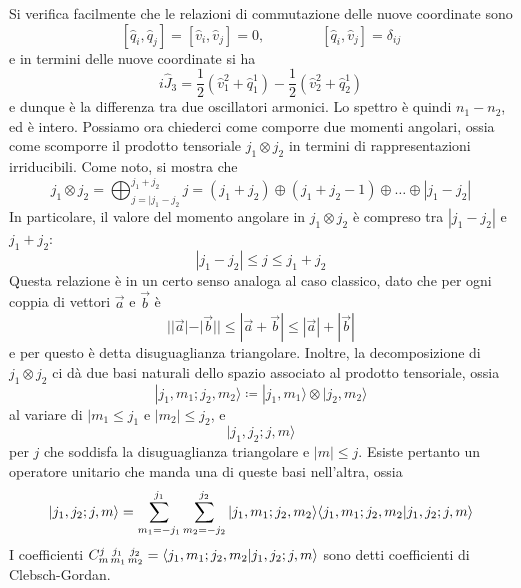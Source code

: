 \documentclass[a4paper, 11pt]{article}
\newcommand{\op}[1]{\hat{#1}}
\renewcommand{\op}[1]{\hat{#1}}
\renewcommand{\ket}[1]{| #1\rangle}
\begin{document}
Si verifica facilmente che le relazioni di commutazione delle nuove coordinate sono
\[[\op q_i,\op q_j]=[\op v_i,\op v_j]=0,\qquad\qquad[\op q_i,\op v_j]=\delta_{ij}\]
e in termini delle nuove coordinate si ha
\[i\op J_3=\frac{1}{2}\left(\op v_1^2+\op q_1^1\right)-\frac{1}{2}\left(\op v_2^2+\op q_2^1\right)\]
e dunque è la differenza tra due oscillatori armonici. Lo spettro è quindi $n_1-n_2$, ed è intero. Possiamo ora chiederci come comporre due momenti angolari, ossia come scomporre il prodotto tensoriale $j_1\otimes j_2$ in termini di rappresentazioni irriducibili. Come noto, si mostra che
\[j_1\otimes j_2=\bigoplus_{j=|j_1-j_2}^{j_1+j_2}j=(j_1+j_2)\oplus(j_1+j_2-1)\oplus\dots\oplus|j_1-j_2|\]
In particolare, il valore del momento angolare in $j_1\otimes j_2$ è compreso tra $|j_1-j_2|$ e $j_1+j_2$:
\[|j_1-j_2|\leq j\leq j_1+j_2\]
Questa relazione è in un certo senso analoga al caso classico, dato che per ogni coppia di vettori $\vec{a}$ e $\vec{b}$ è
\[||\vec{a}|-|\vec{b}||\leq|\vec{a}+\vec{b}|\leq|\vec{a}|+|\vec{b}|\]
e per questo è detta disuguaglianza triangolare. Inoltre, la decomposizione di $j_1\otimes j_2$ ci dà due basi naturali dello spazio associato al prodotto tensoriale, ossia
\[\ket{j_1,m_1;j_2,m_2}\coloneqq\ket{j_1,m_1}\otimes\ket{j_2,m_2}\]
al variare di $|m_1\leq j_1$ e $|m_2|\leq j_2$, e
\[\ket{j_1,j_2;j,m}\]
per $j$ che soddisfa la disuguaglianza triangolare e $|m|\leq j$. Esiste pertanto un operatore unitario che manda una di queste basi nell'altra, ossia
\[\ket{j_1,j_2;j,m}=\sum_{m_1=-j_1}^{j_1}\sum_{m_2=-j_2}^{j_2}\ket{j_1,m_1;j_2,m_2}\braket{j_1,m_1;j_2,m_2}{j_1,j_2;j,m}\]
I coefficienti $\tensor*{C}{^{j\,\,\,\,j_1\,\,\,\,j_2}_{m\,m_1\,m_2}}=\braket{j_1,m_1;j_2,m_2}{j_1,j_2;j,m}$ sono detti coefficienti di Clebsch-Gordan.
\end{document}
